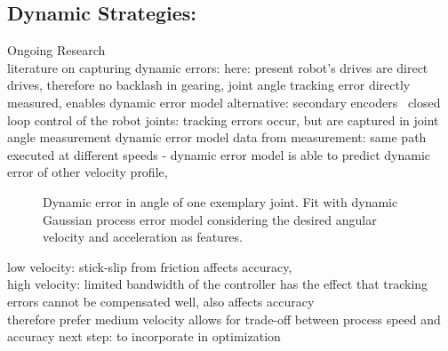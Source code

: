 \documentclass[5p,times,procedia]{elsarticle}
\begin{document}
\subsection{Dynamic Strategies:}\label{subsec:dynError} Ongoing Research \\
literature on capturing dynamic errors:
%
here: present robot’s drives are direct drives, therefore no backlash in gearing, joint angle tracking error directly measured, 
enables dynamic error model
alternative: secondary encoders~\cite{Mesmer22}
%
closed loop control of the robot joints: tracking errors occur, but are captured in joint angle measurement
%
dynamic error model
%
data from measurement: same path executed at different speeds - dynamic error model is able to predict dynamic error of other velocity profile,
%
\begin{figure}[htb]
	\centering
	
	\caption{Dynamic error in angle of one exemplary joint. Fit with dynamic Gaussian process error model considering the desired angular velocity and acceleration as features.}
	\label{fig:error_sources}
\end{figure}
%
low velocity: stick-slip from friction affects accuracy,\\
high velocity: limited bandwidth of the controller has the effect that tracking errors cannot be compensated well, also affects accuracy \\
therefore prefer medium velocity
%
allows for trade-off between process speed and accuracy
%
%
%
next step: to incorporate in optimization
%
\end{document}

